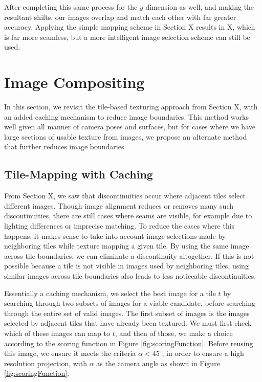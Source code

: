 \documentclass[]{spie}  %
\begin{document}
After completing this same process for the $y$ dimension as well, and
making the resultant shifts, our images overlap and match each other
with far greater accuracy. Applying the simple mapping scheme in
Section X results in X, which is far more seamless, but a more
intelligent image selection scheme can still be used.

\section{Image Compositing}

In this section, we revisit the tile-based texturing approach from
Section X, with an added caching mechanism to reduce image
boundaries. This method works well given all manner of camera poses and
surfaces, but for cases where we have large sections of usable texture
from images, we propose an alternate method that further reduces image
boundaries.

\subsection{Tile-Mapping with Caching}
\label{sec:mappingWithCaching}
From Section X, we saw that discontinuities occur where adjacent tiles
select different images. Though image alignment reduces or removes
many such discontinuities, there are still cases where seams are
visible, for example due to lighting differences or imprecise
matching. To reduce the cases where this happens, it makes sense to
take into account image selections made by neighboring tiles while
texture mapping a given tile. By using the same image across tile
boundaries, we can eliminate a discontinuity altogether. If this is
not possible because a tile is not visible in images used by
neighboring tiles, using similar images across tile boundaries also
leads to less noticeable discontinuities.

Essentially a caching mechanism, we select the best image for a tile
$t$ by searching through two subsets of images for a viable candidate,
before searching through the entire set of valid images. The first
subset of images is the images selected by adjacent tiles that have
already been textured. We must first check which of these images can
map to $t$, and then of those, we make a choice according to the
scoring function in Figure \ref{fig:scoringFunction}. Before reusing
this image, we ensure it meets the criteria $\alpha < 45^\circ$, in
order to ensure a high resolution projection, with $\alpha$ as the
camera angle as shown in Figure \ref{fig:scoringFunction}.
\end{document}
